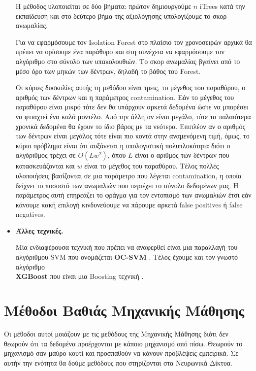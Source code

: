 \documentclass[a4paper,12pt]{report}
\theoremstyle{definitionNODot}
\begin{document}
\begin{itemize}
		Η μέθοδος υλοποιείται σε δύο βήματα: πρώτον δημιουργούμε $n$ iTrees κατά την εκπαίδευση και στο δεύτερο βήμα της αξιολόγησης υπολογίζουμε το σκορ ανωμαλίας.
		
		Για να εφαρμόσουμε τον Isolation Forest στο πλαίσιο τον χρονοσειρών αρχικά θα πρέπει να ορίσουμε ένα παράθυρο και στη συνέχεια να εφαρμόσουμε τον αλγόριθμο στο σύνολο των υπακολουθιών. Το σκορ ανωμαλίας βγαίνει από το μέσο όρο των μηκών των δέντρων, δηλαδή το βάθος του Forest. 
		
		Οι κύριες δυσκολίες αυτής τη μεθόδου είναι τρεις, το μέγεθος του παραθύρου, ο αριθμός των δέντρων και η παράμετρος contamination. Εάν το μέγεθος του παραθύρου είναι μικρό τότε δεν θα υπάρχουν αρκετά δεδομένα ώστε να μπορέσει να φτιαχτεί ένα καλό μοντέλο. Από την άλλη αν είναι μεγάλο, τότε τα παλαιότερα χρονικά δεδομένα θα έχουν το ίδιο βάρος με τα νεότερα. Επιπλέον αν ο αριθμός των δέντρων είναι μεγάλος τότε είναι πιο κοντά στην αναμενόμενη τιμή, όμως, το κύριο πρόβλημα είναι ότι αυξάνεται η υπολογιστική πολυπλοκότητα διότι ο αλγόριθμος τρέχει σε $O(Lw^2)$, όπου $L$ είναι ο αριθμός των δέντρων που κατασκευάζονται και $w$ είναι το μέγεθος του παραθύρου. Τέλος πολλές υλοποιήσεις βασίζονται σε μια παράμετρο που λέγεται contamination, η οποία δείχνει το ποσοστό των ανωμαλιών που περιέχει το σύνολο δεδομένων μας. Η παράμετρος αυτή επηρεάζει το φράγμα για τον εντοπισμό των ανωμαλιών έτσι εάν κάνουμε κακή επιλογή κινδυνεύουμε να πάρουμε αρκετά false positives ή false negatives.
		
		\item \textbf{Άλλες τεχνικές.}
		
		Μία ενδιαφέρουσα τεχνική που πρέπει να αναφερθεί είναι μια παραλλαγή του αλγόριθμου SVM που ονομάζεται \textbf{OC-SVM} \cite{vapnik1964class, ocsvm1999anomalydetection}. Τέλος έχουμε και τον γνωστό αλγόριθμο \\ \textbf{XGBoost} που είναι μια Boosting τεχνική \cite{Chen_2016}.
	\end{itemize}
	
	\section{Μέθοδοι Βαθιάς Μηχανικής Μάθησης}
	Οι μέθοδοι αυτοί μοιάζουν με τις μεθόδους της Μηχανικής Μάθησης διότι δεν θεωρούν ότι τα δεδομένα προέρχονται με κάποιο μηχανισμό από πίσω. Θεωρούν το μηχανισμό σαν μαύρο κουτί και προσπαθούν να κάνουν προβλέψεις εμπειρικά. Σε αυτήν την ενότητα θα δούμε μεθόδους που στηρίζονται στα Νευρωνικά Δίκτυα.
	
\end{document}
